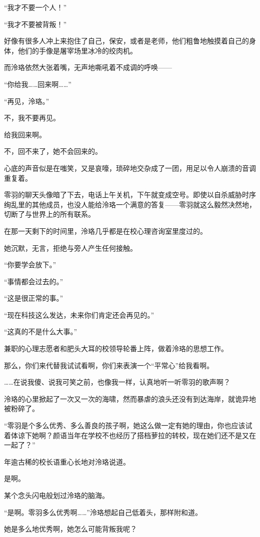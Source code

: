 \documentclass[UTF8, scheme = chinese, openany]{ctexbook}
\begin{document}
“我才不要一个人！”

“我才不要被背叛！”

好像有很多人冲上来抱住了自己，保安，或者是老师，他们粗鲁地触摸着自己的身体，他们的手像是屠宰场里冰冷的绞肉机。

而泠珞依然大张着嘴，无声地嘶吼着不成调的呼唤——

“你给我……回来啊……”

\vspace{1.5em}

“再见，泠珞。”

不，我不要再见。

给我回来啊。

不，回不来了，她不会回来的。

心底的声音似是在嗤笑，又是哀嚎，琐碎地交杂成了一团，用足以令人崩溃的音调重复着。

零羽的聊天头像暗了下去，电话上午关机，下午就变成空号。即使以自杀威胁时序绚乱里的其他成员，也没人能给泠珞一个满意的答复——零羽就这么毅然决然地，切断了与世界上的所有联系。

在那一天剩下的时间里，泠珞几乎都是在校心理咨询室里度过的。

她沉默，无言，拒绝与旁人产生任何接触。

“你要学会放下。”

“事情都会过去的。”

“这是很正常的事。”

“现在科技这么发达，未来你们肯定还会再见的。”

“这真的不是什么大事。”

兼职的心理志愿者和肥头大耳的校领导轮番上阵，做着泠珞的思想工作。

那么，你们来代替我试试看啊，你们来表演一个“平常心”给我看啊。

……在说我傻、说我可笑之前，也像我一样，认真地听一听零羽的歌声啊？

泠珞的心里掀起了一次又一次的海啸，然而暴虐的浪头还没有到达海岸，就诡异地被粉碎了。

“零羽是个多么优秀、多么善良的孩子啊，她这么做一定有她的理由，你也应该试着体谅下她啊？颜语当年在学校不也经历了搭档萝拉的转校，现在她们还不是又在一起了？”

年逾古稀的校长语重心长地对泠珞说道。

是啊。

某个念头闪电般划过泠珞的脑海。

“是啊。零羽多么优秀啊……”泠珞想起自己低着头，那样附和道。

她是多么地优秀啊，她怎么可能背叛我呢？
\end{document}
